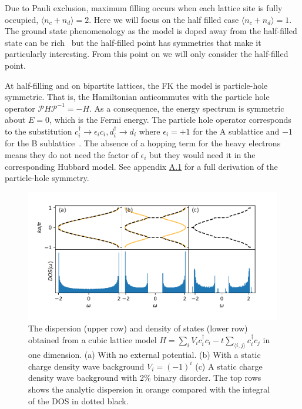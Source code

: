 Due to Pauli exclusion, maximum filling occurs when each lattice site is fully occupied, \(\langle n_c + n_d \rangle = 2\). Here we will focus on the half filled case \(\langle n_c + n_d \rangle = 1\). The ground state phenomenology as the model is doped away from the half-filled state can be rich~\autocite{jedrzejewskiFalicovKimballModels2001,gruberGroundStatesSpinless1990} but the half-filled point has symmetries that make it particularly interesting. From this point on we will only consider the half-filled point.

At half-filling and on bipartite lattices, the FK the model is particle-hole symmetric. That is, the Hamiltonian anticommutes with the particle hole operator \(\mathcal{P}H\mathcal{P}^{-1} = -H\). As a consequence, the energy spectrum is symmetric about \(E = 0\), which is the Fermi energy. The particle hole operator corresponds to the substitution \(c^\dagger_i \rightarrow \epsilon_i c_i, d^\dagger_i \rightarrow d_i\) where \(\epsilon_i = +1\) for the A sublattice and \(-1\) for the B sublattice~\autocite{gruberFalicovKimballModel2005}. The absence of a hopping term for the heavy electrons means they do not need the factor of \(\epsilon_i\) but they would need it in the corresponding Hubbard model. See appendix \protect\hyperlink{particle-hole-symmetry}{A.1} for a full derivation of the particle-hole symmetry.

\hypertarget{fig:simple_DOS}{%
\begin{figure}
\centering
\includegraphics[width=1\textwidth,height=\textheight]{figure_code/background_chapter/simple_DOS}
\caption[{Cubic Lattice dispersion with disorder}]{The dispersion (upper row) and density of states (lower row) obtained from a cubic lattice model \(H = \sum_{i} V_i c^\dagger_{i}c_{i} - t \sum_{\langle i,j\rangle} c^\dagger_{i}c_{j}\) in one dimension. (a) With no external potential. (b) With a static charge density wave background \(V_i = (-1)^i\) (c) A static charge density wave background with 2\% binary disorder. The top rows shows the analytic dispersion in orange compared with the integral of the DOS in dotted black.}
\label{fig:simple_DOS}
\end{figure}
}

